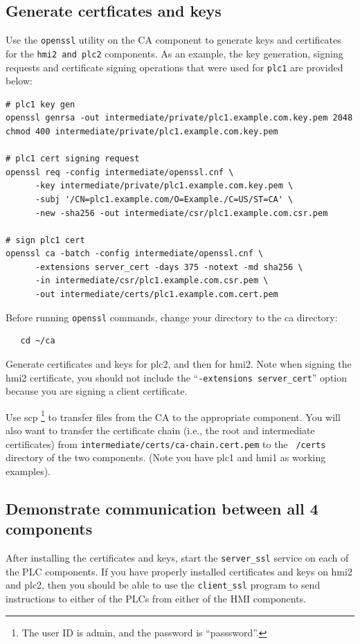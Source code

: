 \subsection{Generate certficates and keys}
Use the {\tt openssl} utility on the CA component to generate keys and certificates for the {\tt hmi2 and \tt plc2} components.
As an example, the key generation, signing requests and certificate signing operations that were
used for {\tt plc1} are provided below:
\begin{verbatim}
# plc1 key gen
openssl genrsa -out intermediate/private/plc1.example.com.key.pem 2048
chmod 400 intermediate/private/plc1.example.com.key.pem

# plc1 cert signing request
openssl req -config intermediate/openssl.cnf \
      -key intermediate/private/plc1.example.com.key.pem \
      -subj '/CN=plc1.example.com/O=Example./C=US/ST=CA' \
      -new -sha256 -out intermediate/csr/plc1.example.com.csr.pem

# sign plc1 cert
openssl ca -batch -config intermediate/openssl.cnf \
      -extensions server_cert -days 375 -notext -md sha256 \
      -in intermediate/csr/plc1.example.com.csr.pem \
      -out intermediate/certs/plc1.example.com.cert.pem
\end{verbatim}
Before running {\tt openssl} commands, change your directory to the ca directory:
\begin{verbatim}
   cd ~/ca
\end{verbatim}
Generate certificates and keys for plc2, and then for hmi2.  Note when signing 
the hmi2 certificate, you should not include the ``{\tt -extensions server\_cert}'' option
because you are signing a client certificate.

Use scp \footnote{The user ID is admin, and the password is ``passsword''.} 
to transfer files from the CA to the appropriate component.
You will also want to transfer the certificate chain (i.e., the root and intermediate
certificates) from {\tt intermediate/certs/ca-chain.cert.pem} to the {\tt ~/certs} directory 
of the two components.  (Note you have plc1 and hmi1 as working examples).

\subsection{Demonstrate communication between all 4 components}
After installing the certificates and keys, start the {\tt server\_ssl}
service on each of the PLC components.
If you have properly installed certificates and keys on hmi2 and plc2, then you should
be able to use the {\tt client\_ssl} program to send instructions to either of the
PLCs from either of the HMI components.  

